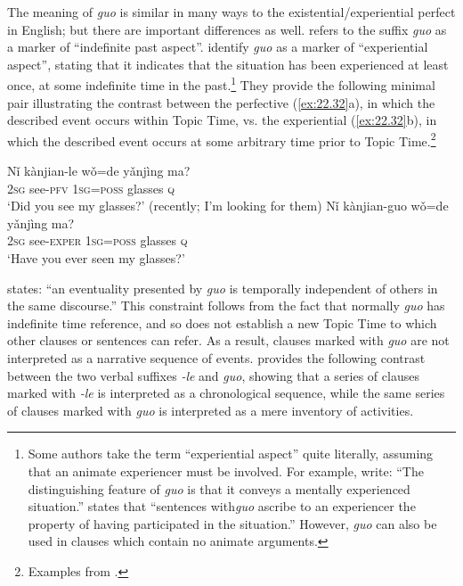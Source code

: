 The meaning of  \textit{guo} is similar in many ways to the existential/experiential perfect in English; but there are important differences as well. \citet{Chao1968} refers to the suffix \textit{guo} as a marker of “indefinite past aspect”. \citet[226]{LiThompson1981} identify \textit{guo} as a marker of “experiential aspect”, stating that it indicates that the situation has been experienced at least once, at some indefinite time in the past.\footnote{Some authors take the term “experiential aspect” quite literally, assuming that an animate experiencer must be involved. For example, \citet[144]{XiaoMcEnery2004} write: “The distinguishing feature of \textit{guo} is that it conveys a mentally experienced situation.” \citet[267]{Smith1997} states that “sentences with\textit{guo} ascribe to an experiencer the property of having participated in the situation.” However, \textit{guo} can also be used in clauses which contain no animate arguments.} They provide the following minimal pair illustrating the contrast between the perfective (\ref{ex:22.32}a), in which the described event occurs within Topic Time, vs. the experiential (\ref{ex:22.32}b), in which the described event occurs at some arbitrary time prior to Topic Time.\footnote{Examples from \textcites[19]{Ma1977}[227]{LiThompson1981}.}


\ea \label{ex:22.32}
\ea  \gll Nǐ  kànjian-le  wǒ=de  yǎnjìng  ma?\\
\textsc{2sg}  see-\textsc{pfv}  \textsc{1sg}=\textsc{poss}  glasses  \textsc{q}\\
\glt ‘Did you see my glasses?’ (recently; I’m looking for them)
\ex \gll  Nǐ  kànjian-guo  wǒ=de  yǎnjìng  ma?\\
\textsc{2sg}  see-\textsc{exper}  \textsc{1sg}=\textsc{poss}  glasses  \textsc{q}\\
\glt ‘Have you ever seen my glasses?’
\z \z


\citet{Wu2009} states: “an eventuality presented by \textit{guo} is temporally independent of others in the same discourse.” This constraint follows from the fact that normally \textit{guo} has indefinite time reference, and so does not establish a new Topic Time to which other clauses or sentences can refer. As a result, clauses marked with \textit{guo} are not interpreted as a narrative sequence of events. \citet[308]{Iljic1990} provides the following contrast between the two verbal suffixes \textit{-le} and \textit{guo}, showing that a series of clauses marked with \textit{-le} is interpreted as a chronological sequence, while the same series of clauses marked with \textit{guo} is interpreted as a mere inventory of activities.


